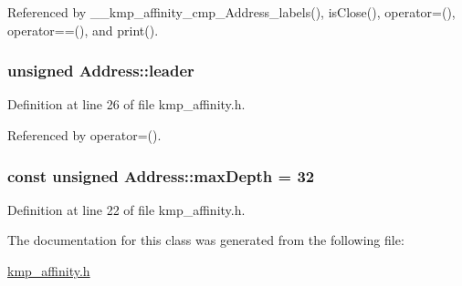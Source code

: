 Referenced by \-\_\-\-\_\-kmp\-\_\-affinity\-\_\-cmp\-\_\-\-Address\-\_\-labels(), is\-Close(), operator=(), operator==(), and print().

\hypertarget{classAddress_ab1535594352babbc297fc1d2b5a48c1a}{
\subsubsection[{leader}]{\setlength{\rightskip}{0pt plus 5cm}unsigned Address\-::leader}}\label{classAddress_ab1535594352babbc297fc1d2b5a48c1a}


Definition at line 26 of file kmp\-\_\-affinity.\-h.



Referenced by operator=().

\hypertarget{classAddress_a3c90109b9f20aa28996a78712557683c}{
\subsubsection[{max\-Depth}]{\setlength{\rightskip}{0pt plus 5cm}const unsigned Address\-::max\-Depth = 32\hspace{0.3cm}{\ttfamily [static]}}}\label{classAddress_a3c90109b9f20aa28996a78712557683c}


Definition at line 22 of file kmp\-\_\-affinity.\-h.



The documentation for this class was generated from the following file\-:\begin{DoxyCompactItemize}
\item 
\hyperlink{kmp__affinity_8h}{kmp\-\_\-affinity.\-h}\end{DoxyCompactItemize}
